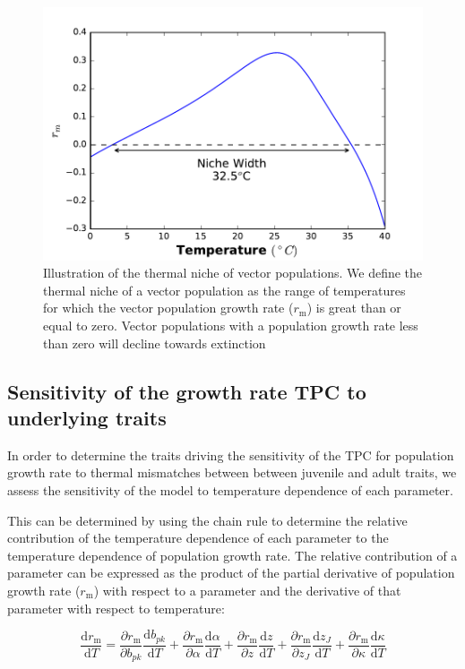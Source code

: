 \begin{figure}[H] 
	\centering
	\includegraphics[width = .7\textwidth]{results/r_TPC.pdf}
	\caption{Illustration of the thermal niche of vector populations. We define the thermal niche of a vector population as the range of temperatures for which the vector population growth rate ($r_\text{m}$) is great than or equal to zero. Vector populations with a population growth rate less than zero will decline towards extinction}
\label{fig:ThermalNiche}
\end{figure} 

\subsection*{Sensitivity of the growth rate TPC to underlying traits}

In order to determine the traits driving the sensitivity of the TPC for population growth rate to thermal mismatches between between juvenile and adult traits, we assess the sensitivity of the model to temperature dependence of each parameter.

This can be determined by using the chain rule to determine the relative contribution of the temperature dependence of each parameter to the temperature dependence of population growth rate. The relative contribution of a parameter can be expressed as the product of the partial derivative of population growth rate  ($r_\text{m}$) with respect to a parameter and the derivative of that parameter with respect to temperature:

\begin{equation}\label{eq:sensitivity}
	\frac{\mathrm{d}r_\mathrm{m}}{\mathrm{d}T} = 
	\frac{\partial r_\mathrm{m}}{\partial b_{pk}} \frac{\mathrm{d}b_{pk}}{\mathrm{d}T} + 
	\frac{\partial r_\mathrm{m}}{\partial \alpha}\frac{\mathrm{d}\alpha}{\mathrm{d}T} + 
	\frac{\partial r_\mathrm{m}}{\partial z} \frac{\mathrm{d}z}{\mathrm{d}T} +
	\frac{\partial r_\mathrm{m}}{\partial z_J} \frac{\mathrm{d}z_J}{\mathrm{d}T} + 
	\frac{\partial r_\mathrm{m}}{\partial \kappa} \frac{\mathrm{d}\kappa}{\mathrm{d}T} 
\end{equation}

